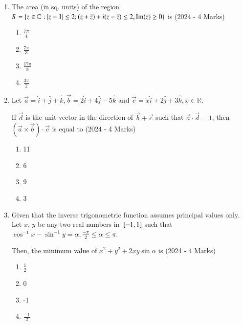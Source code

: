 \documentclass[journal]{IEEEtran}
\begin{document}
\begin{enumerate}
{        }
    \item{
        	
        	The area (in sq. units) of the region $S=\left\{z \in \mathbb{C}:|z-1| \leq 2 ;(z+\bar{z})+i(z-\bar{z}) \leq 2, \operatorname{Im}(z) \geq 0\right\}$ is\hfill
                {(2024 - 4 Marks)}
				\begin{multicols}{4}
	                \begin{enumerate}
	                	\item $\frac{7 \pi}{4}$
	                	\item $\frac{7 \pi}{3}$
	                	\item $\frac{17 \pi}{8}$
	                	\item $\frac{3 \pi}{2}$
	                \end{enumerate}
				\end{multicols}
        
        }
 \item{
    	
	    	Let $\vec{a}=\hat{i}+\hat{j}+\hat{k}, \vec{b}=2 \hat{i}+4 \hat{j}-5 \hat{k}$ and $\vec{c}=x \hat{i}+2 \hat{j}+3 \hat{k}, x \in \mathbb{R}$.
	    	
	    	If $\vec{d}$ is the unit vector in the direction of $\vec{b}+\vec{c}$ such that $\vec{a} \cdot \vec{d}=1$, then $(\vec{a} \times \vec{b}) \cdot \vec{c}$ is equal to
	    	\text{   }\hfill
	    	{(2024 - 4 Marks)}
	    	\begin{multicols}{4}
	    		\begin{enumerate}
	    			\item 11
	    			\item 6
	    			\item 9
	    			\item 3
	    		\end{enumerate}
	    	\end{multicols}
	    	
	    }
    \item{
			
			Given that the inverse trigonometric function assumes principal values only. Let $x$, $y$ be any two real numbers in ${}\left[-1,1\right]$ such that $\cos ^{-1} x-\sin ^{-1} y=\alpha, \frac{-\pi}{2} \leq \alpha \leq \pi$.
			
			Then, the minimum value of $x^{2}+y^{2}+2 x y \sin \alpha$ is
			\text{   }\hfill
			{(2024 - 4 Marks)}
			\begin{multicols}{4}
				\begin{enumerate}
						\item $\frac{1}{2}$
						\item 0
						\item -1
						\item $\frac{-1}{2}$
				\end{enumerate}
			\end{multicols}
			
}
\end{enumerate}
\end{document}
